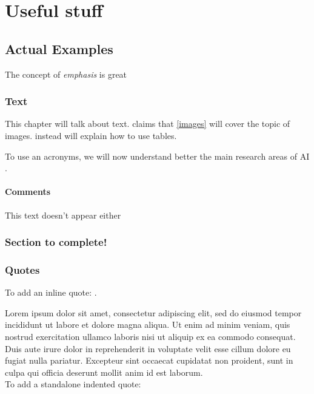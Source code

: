 \part{Useful stuff}

\chapter{Actual Examples}

The concept of \emph{emphasis} is great

\section{Text}

This chapter will talk about text.
\textcite{QUINN2023} claims that \cref{images} will cover the topic of images.
 instead will explain how to use tables.


To use an acronyms, we will now understand better the main research areas of \ac{AI} \autocite{RUSSELL2020}.

\subsection{Comments}


\begin{ignore}
 This
 text
 doesn't
 appear
 either
\end{ignore}


\section{Section to complete!}


\placeholder

\section{Quotes}

To add an inline quote: .

Lorem ipsum dolor sit amet, consectetur adipiscing elit, sed do eiusmod tempor incididunt ut labore et dolore magna aliqua. Ut enim ad minim veniam, quis nostrud exercitation ullamco laboris nisi ut aliquip ex ea commodo consequat. Duis aute irure dolor in reprehenderit in voluptate velit esse cillum dolore eu fugiat nulla pariatur. Excepteur sint occaecat cupidatat non proident, sunt in culpa qui officia deserunt mollit anim id est laborum.\\
To add a standalone indented quote:

